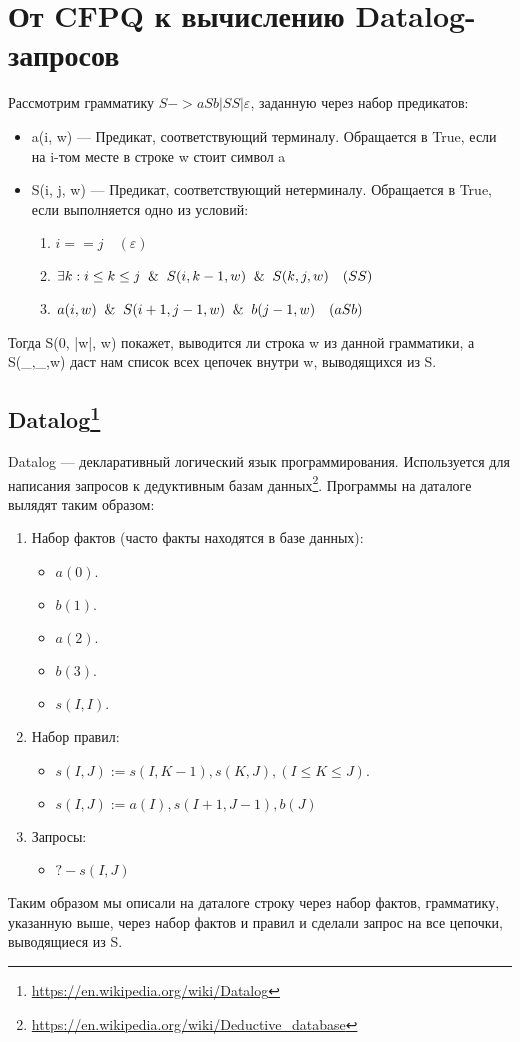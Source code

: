 \section{От CFPQ к вычислению Datalog-запросов}\label{Subsection Datalog}
Рассмотрим грамматику  $S -> aSb | SS | \varepsilon$, заданную через набор предикатов:
\begin{itemize}
	\item a(i, w) --- Предикат, соответствующий терминалу. Обращается в True, если на i-том месте в строке w стоит символ a
	\item S(i, j, w) --- Предикат, соответствующий нетерминалу. Обращается в True, если выполняется одно из условий:
	\begin{enumerate}
		\item $i == j \quad(\varepsilon)$
		\item $\exists k: i \leq k \leq j \And S(i, k - 1, w) \And S(k, j, w)  \quad (SS)$
		\item  ${a(i, w) \And S(i+1, j-1, w) \And b(j-1, w)} \quad (aSb)$
	\end{enumerate}
\end{itemize}

Тогда S(0, |w|, w) покажет, выводится ли строка w из данной грамматики,
а S(\_,\_,w) даст нам список всех цепочек внутри w, выводящихся из S.

\subsection{Datalog\footnote{\url{https://en.wikipedia.org/wiki/Datalog}}}
Datalog --- декларативный логический язык программирования. Используется для написания запросов к дедуктивным базам данных\footnote{\url{https://en.wikipedia.org/wiki/Deductive_database}}. Программы на даталоге вылядят таким образом:
\begin{enumerate}
	\item Набор фактов (часто факты находятся в базе данных):
	\begin{itemize}
		\item $a(0).$
		\item $b(1).$
		\item $a(2).$
		\item $b(3).$
		\item $s(I, I).$
	\end{itemize}
	\item Набор правил:
	\begin{itemize}
		\item $s(I, J) := s(I, K-1), s(K,J), (I \leq K \leq J).$
		\item $s(I,J):=a(I), s(I+1, J-1),b(J)$
	\end{itemize}
	\item Запросы:
	\begin{itemize}
		\item $?- s(I, J)$
	\end{itemize}
\end{enumerate}
Таким образом мы описали на даталоге строку через набор фактов, грамматику, указанную выше, через набор фактов и правил и сделали запрос на все цепочки, выводящиеся из S. 

